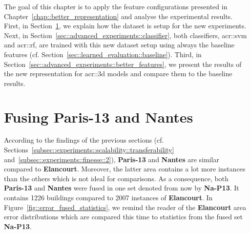 \minitoc

\vfill

The goal of this chapter is to apply the feature configurations presented in Chapter~\ref{chap::better_representation} and analyse the experimental results.
First, in Section~\ref{sec::advanced_experiments::dataset}, we explain how the dataset is setup for the new experiments.
Next, in Section~\ref{sec::advanced_experiments::classifier}, both classifiers, \gls{acr::svm} and \gls{acr::rf}, are trained with this new dataset setup using always the baseline features (cf. Section~\ref{sec::learned_evaluation::baseline}).
Third, in Section~\ref{sec::advanced_experiments::better_features}, we present the results of the new representation for \gls{acr::3d} models and compare them to the baseline results.

\clearpage

\section{Fusing \textbf{Paris-13} and \textbf{Nantes}}
    \label{sec::advanced_experiments::dataset}
    According to the findings of the previous sections (cf. Sections~\ref{subsec::experiments::scalability::transferability} and~\ref{subsec::experiments::finesse::2}), \textbf{Paris-13} and \textbf{Nantes} are similar compared to \textbf{Elancourt}.
    Moreover, the latter area contains a lot more instances than the others which is not ideal for comparisons.
    As a consequence, both \textbf{Paris-13} and \textbf{Nantes} were fused in one set denoted from now by \textbf{Na-P13}.
    It contains \num{1226} buildings compared to \num{2007} instances of \textbf{Elancourt}.
    In Figure~\ref{fig::error_fused_statistics}, we remind the reader of the \textbf{Elancourt} area error distributions which are compared this time to statistics from the fused set \textbf{Na-P13}.\\

